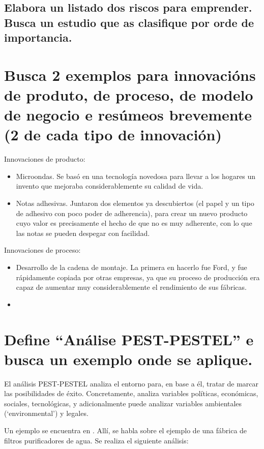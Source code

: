 \documentclass[a4paper]{article}
\begin{document}
\subsection{Elabora un listado dos riscos para emprender. Busca un estudio que as clasifique por orde de importancia.}

\section{Busca 2 exemplos para innovacións de produto, de proceso, de modelo de negocio e resúmeos brevemente (2 de cada tipo de innovación)}

Innovaciones de producto:
\begin{itemize}
    \item Microondas. Se basó en una tecnología novedosa para llevar a los hogares un invento que mejoraba considerablemente su calidad de vida.
    \item Notas adhesivas. Juntaron dos elementos ya descubiertos (el papel y un tipo de adhesivo con poco poder de adherencia), para crear un nuevo producto cuyo valor es precisamente el hecho de que no es muy adherente, con lo que las notas se pueden despegar con facilidad.
\end{itemize}

Innovaciones de proceso:
\begin{itemize}
    \item Desarrollo de la cadena de montaje. La primera en hacerlo fue Ford, y fue rápidamente copiada por otras empresas, ya que su proceso de producción era capaz de aumentar muy considerablemente el rendimiento de sus fábricas.
    \item 
\end{itemize}

\section{Define ``Análise PEST-PESTEL'' e busca un exemplo onde se aplique.}

El análisis PEST-PESTEL analiza el entorno para, en base a él, tratar de marcar las posibilidades de éxito. Concretamente, analiza variables políticas, económicas, sociales, tecnológicas, y adicionalmente puede analizar variables ambientales (`environmental') y legales.

Un ejemplo se encuentra en \cite{RefWorks:doc:602fb2058f0825dac8eafc64}. Allí, se habla sobre el ejemplo de una fábrica de filtros purificadores de agua. Se realiza el siguiente análisis:
\end{document}
